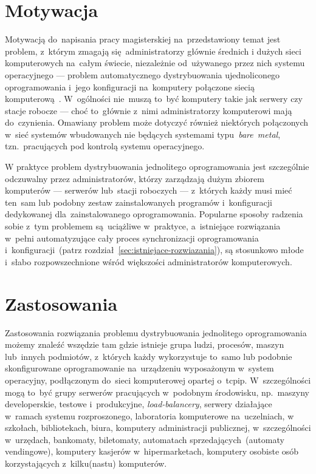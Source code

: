 \documentclass[thesis]{subfiles}
\begin{document}
\section{Motywacja}

Motywacją do~napisania pracy magisterskiej na~przedstawiony temat jest problem, z~którym zmagają się~administratorzy głównie średnich i dużych sieci komputerowych na~całym świecie, niezależnie od~używanego przez nich systemu operacyjnego --- problem automatycznego dystrybuowania ujednoliconego oprogramowania i~jego konfiguracji na~komputery połączone siecią komputerową~\cite{so-problem-intro}. W~ogólności nie~muszą to~być komputery takie jak serwery czy stacje robocze --- choć to~głównie z~nimi administratorzy komputerowi mają do~czynienia. Omawiany problem może dotyczyć również niektórych połączonych w~sieć systemów wbudowanych nie będących systemami typu~\mbox{\emph{bare~metal}}, tzn.~pracujących pod kontrolą systemu operacyjnego.

W praktyce problem dystrybuowania jednolitego oprogramowania jest szczególnie odczuwalny przez administratorów, którzy zarządzają dużym zbiorem komputerów --- serwerów lub~stacji roboczych --- z~których każdy musi mieć ten~sam lub podobny zestaw zainstalowanych programów i~konfiguracji dedykowanej dla~zainstalowanego oprogramowania. Popularne sposoby radzenia sobie z~tym problemem są~uciążliwe w~praktyce, a~istniejące rozwiązania w~pełni automatyzujące cały proces synchronizacji oprogramowania i~konfiguracji~(patrz rozdział~\ref{sec:istniejace-rozwiazania}), są stosunkowo młode i~słabo rozpowszechnione wśród większości administratorów komputerowych.


\section{Zastosowania}

Zastosowania rozwiązania problemu dystrybuowania jednolitego oprogramowania możemy znaleźć wszędzie tam gdzie istnieje grupa ludzi, procesów, maszyn lub~innych podmiotów, z~których każdy wykorzystuje to~samo lub podobnie skonfigurowane oprogramowanie na~urządzeniu wyposażonym w~system operacyjny, podłączonym do~sieci komputerowej opartej o~\gls{tcpip}. W~szczególności mogą to~być grupy serwerów pracujących w~podobnym środowisku, np.~maszyny developerskie, testowe i~produkcyjne, \emph{load-balancery}, serwery działające w~ramach systemu rozproszonego, laboratoria komputerowe na~uczelniach, w szkołach, bibliotekach, biura, komputery administracji publicznej, w~szczególności w~urzędach, bankomaty, biletomaty, automatach sprzedających~(automaty vendingowe), komputery kasjerów w~hipermarketach, komputery osobiste osób korzystających z~kilku(nastu) komputerów.
\end{document}
